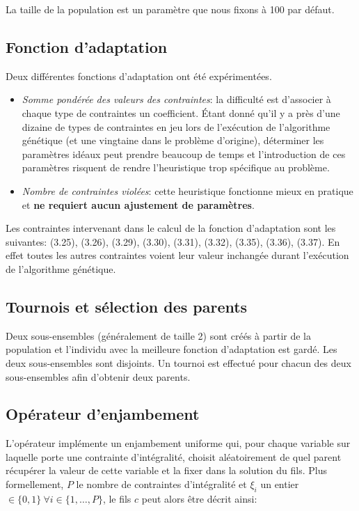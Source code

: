 La taille de la population est un paramètre que nous fixons à 100 par défaut.

\subsection{Fonction d'adaptation}

Deux différentes fonctions d'adaptation ont été expérimentées.
\begin{itemize}
    \item \textit{Somme pondérée des valeurs des contraintes}: la difficulté est d'associer à chaque
    type de contraintes un coefficient. \'Etant donné qu'il y a près d'une dizaine de types de contraintes
    en jeu lors de l'exécution de l'algorithme génétique (et une vingtaine dans le problème d'origine),
    déterminer les paramètres idéaux peut prendre beaucoup de temps et l'introduction de ces paramètres
    risquent de rendre l'heuristique trop spécifique au problème.
    \item \textit{Nombre de contraintes violées}: cette heuristique fonctionne mieux en pratique et \textbf{ne
    requiert aucun ajustement de paramètres}.
\end{itemize}

Les contraintes intervenant dans le calcul de la fonction d'adaptation sont les suivantes:
(3.25), (3.26), (3.29), (3.30), (3.31), (3.32), (3.35), (3.36), (3.37). En effet toutes les autres contraintes
voient leur valeur inchangée durant l'exécution de l'algorithme génétique.

\subsection{Tournois et sélection des parents}

Deux sous-ensembles (généralement de taille 2) sont créés à partir de la population
et l'individu avec la meilleure fonction d'adaptation est gardé.
Les deux sous-ensembles sont disjoints. Un tournoi est effectué pour chacun des deux
sous-ensembles afin d'obtenir deux parents.

\subsection{Opérateur d'enjambement}

L'opérateur implémente un enjambement uniforme qui, pour chaque variable sur laquelle
porte une contrainte d'intégralité, choisit aléatoirement de quel parent récupérer
la valeur de cette variable et la fixer dans la solution du fils.
Plus formellement, $P$ le nombre de contraintes d'intégralité et $\xi_i$ un entier
$\in \{0, 1\} \ \forall i \in \{1, \ldots, P\}$, le fils $c$ peut alors être décrit ainsi:

